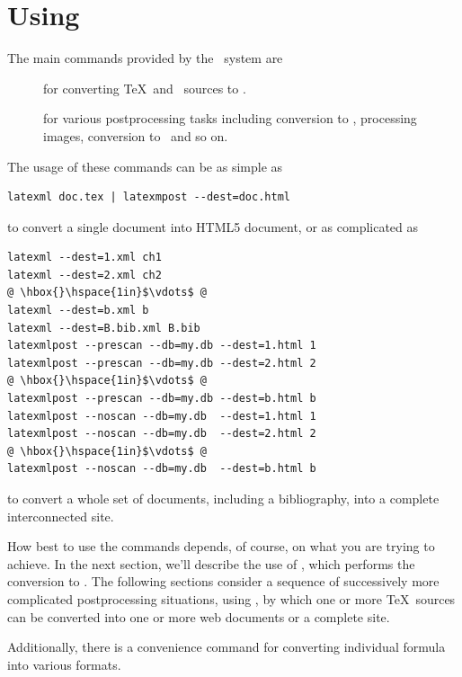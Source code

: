 \documentclass{book}
\begin{document}
\chapter{Using \LaTeXML}\label{usage}
The main commands provided by the \LaTeXML\ system are
\begin{description}
\item[] for converting \TeX\ and \BibTeX\ sources to \XML.
\item[] for various postprocessing tasks including
conversion to \HTML, processing images, conversion to \MathML\ and so on.
\end{description}
\noindent The usage of these commands can be as simple as
\begin{lstlisting}[style=shell]
latexml doc.tex | latexmpost --dest=doc.html
\end{lstlisting}
\noindent to convert a single document into \textsc{HTML5} document,
 or as complicated as
\begin{lstlisting}[style=shell]
latexml --dest=1.xml ch1
latexml --dest=2.xml ch2
@ \hbox{}\hspace{1in}$\vdots$ @
latexml --dest=b.xml b
latexml --dest=B.bib.xml B.bib
latexmlpost --prescan --db=my.db --dest=1.html 1
latexmlpost --prescan --db=my.db --dest=2.html 2
@ \hbox{}\hspace{1in}$\vdots$ @
latexmlpost --prescan --db=my.db --dest=b.html b
latexmlpost --noscan --db=my.db  --dest=1.html 1
latexmlpost --noscan --db=my.db  --dest=2.html 2
@ \hbox{}\hspace{1in}$\vdots$ @
latexmlpost --noscan --db=my.db  --dest=b.html b
\end{lstlisting}
\noindent to convert a whole set of documents, including a bibliography,
into a complete interconnected site.

How best to use the commands depends, of course, on what you
are trying to achieve.  In the next section, we'll describe
the use of , which performs the conversion to \XML.
The following sections consider a sequence of
successively more complicated postprocessing situations,
using ,
by which one or more \TeX\ sources can be converted into
one or more web documents or a complete site.

Additionally, there is a convenience command 
for converting individual formula into various formats.

\end{document}

